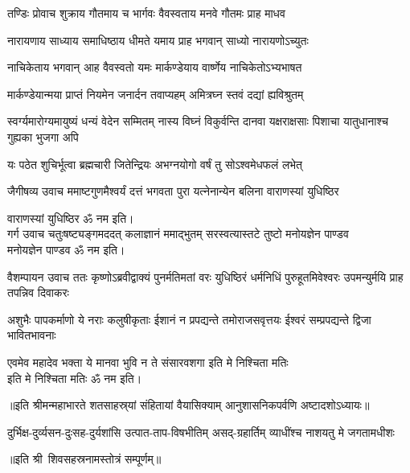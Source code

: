 \twolineshloka
{तण्डिः प्रोवाच शुक्राय गौतमाय च भार्गवः}%
{वैवस्वताय मनवे गौतमः प्राह माधव}%

\twolineshloka
{नारायणाय साध्याय समाधिष्ठाय धीमते}%
{यमाय प्राह भगवान् साध्यो नारायणोऽच्युतः}%

\twolineshloka
{नाचिकेताय भगवान् आह वैवस्वतो यमः}%
{मार्कण्डेयाय वार्ष्णेय नाचिकेतोऽभ्यभाषत}%

\twolineshloka
{मार्कण्डेयान्मया प्राप्तं नियमेन जनार्दन}%
{तवाप्यहम् अमित्रघ्न स्तवं दद्यां ह्यविश्रुतम्}%



\threelineshloka
{स्वर्ग्यमारोग्यमायुष्यं धन्यं वेदेन सम्मितम्}
{नास्य विघ्नं विकुर्वन्ति दानवा यक्षराक्षसाः}%
{पिशाचा यातुधानाश्च गुह्यका भुजगा अपि}%

\twolineshloka
{यः पठेत शुचिर्भूत्वा ब्रह्मचारी जितेन्द्रियः}%
{अभग्नयोगो वर्षं तु सोऽश्वमेधफलं लभेत्}%

जैगीषव्य उवाच
\twolineshloka
{ममाष्टगुणमैश्वर्यं दत्तं भगवता पुरा}%
{यत्नेनान्येन बलिना वाराणस्यां युधिष्ठिर}%

वाराणस्यां युधिष्ठिर ॐ नम इति।\\

\newpage
गर्ग उवाच
\twolineshloka
{चतुःषष्ट्यङ्गमददत् कलाज्ञानं ममाद्भुतम्}%
{सरस्वत्यास्तटे तुष्टो मनोयज्ञेन पाण्डव}\mbox{}\\[-1.6em]%
मनोयज्ञेन पाण्डव ॐ नम इति।

वैशम्पायन उवाच
\threelineshloka
{ततः कृष्णोऽब्रवीद्वाक्यं पुनर्मतिमतां वरः}
{युधिष्ठिरं धर्मनिधिं पुरुहूतमिवेश्वरः}%
{उपमन्युर्मयि प्राह तपन्निव दिवाकरः}%

\threelineshloka
{अशुभैः पापकर्माणो ये नराः कलुषीकृताः}
{ईशानं न प्रपद्यन्ते तमोराजसवृत्तयः}%
{ईश्वरं सम्प्रपद्यन्ते द्विजा भावितभावनाः}%


\twolineshloka
{एवमेव महादेव भक्ता ये मानवा भुवि}%
{न ते संसारवशगा इति मे निश्चिता मतिः}\mbox{}\\[-1.6em]%
इति मे निश्चिता मतिः ॐ नम इति।

॥इति श्रीमन्महाभारते शतसाहस्र्यां संहितायां वैयासिक्याम् आनुशासनिकपर्वणि अष्टादशोऽध्यायः॥

{दुर्भिक्ष-दुर्व्यसन-दुःसह-दुर्यशांसि}
{उत्पात-ताप-विषभीतिम् असद्‌-ग्रहार्तिम्}
{व्याधींश्च नाशयतु मे जगतामधीशः}

॥इति श्री~शिवसहस्रनामस्तोत्रं सम्पूर्णम्॥